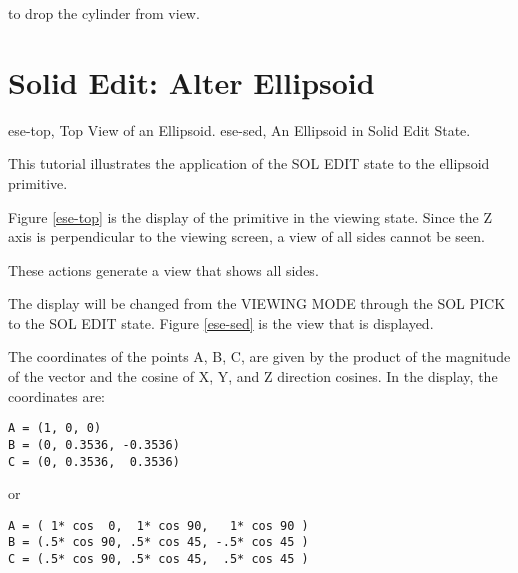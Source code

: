 
to drop the cylinder from view.

\section{Solid Edit: Alter Ellipsoid}
\mfig ese-top, Top View of an Ellipsoid.
\mfig ese-sed, An Ellipsoid in Solid Edit State.

This tutorial illustrates the application of the SOL EDIT state to the
ellipsoid primitive.


Figure \ref{ese-top} is the display of the primitive in the viewing state.
Since the
Z axis is perpendicular to the viewing screen, a view of all sides cannot be
seen.


These actions generate a view that shows all sides.


The display will be changed from the VIEWING MODE through the SOL PICK to
the SOL EDIT state.  Figure \ref{ese-sed} is the view that is displayed.

The coordinates of the points A, B, C, are given by the product of the
magnitude of the vector and the cosine of X, Y, and Z direction cosines.  In 
the display, the coordinates are:

\begin{center}
\begin{verbatim}
A = (1, 0, 0)
B = (0, 0.3536, -0.3536)
C = (0, 0.3536,  0.3536)
\end{verbatim}
\end{center}
or
\begin{center}
\begin{verbatim}
A = ( 1* cos  0,  1* cos 90,   1* cos 90 )
B = (.5* cos 90, .5* cos 45, -.5* cos 45 )
C = (.5* cos 90, .5* cos 45,  .5* cos 45 )
\end{verbatim}
\end{center}

